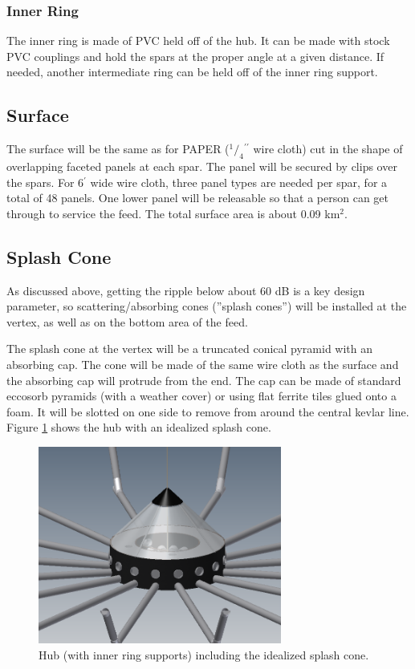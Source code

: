 \documentclass[11pt]{article}
\newcommand{\inch}{$^{\prime\prime}$}
\newcommand{\foot}{$^{\prime}$}
\begin{document}
\subsubsection{Inner Ring}
The inner ring is made of PVC held off of the hub.  It can be made with stock PVC couplings and hold the spars at the proper angle at a given distance.  If needed, another intermediate ring can be held off of the inner ring support.

\subsection{Surface}
The surface will be the same as for PAPER ($^1/_4$\inch{} wire cloth) cut in the shape of overlapping faceted panels at each spar.  The panel will be secured by clips over the spars.  For 6\foot{} wide wire cloth, three panel types are needed per spar, for a total of 48 panels.  One lower panel will be releasable so that a person can get through to service the feed.   The total surface area is about 0.09 km$^2$.

\subsection{Splash Cone}
As discussed above, getting the ripple below about 60 dB is a key design parameter, so scattering/absorbing cones (''splash cones'') will be installed at the vertex, as well as on the bottom area of the feed.

The splash cone at the vertex will be a truncated conical pyramid with an absorbing cap.  The cone will be made of the same wire cloth as the surface and the absorbing cap will protrude from the end.  The cap can be made of standard eccosorb pyramids (with a weather cover) or using flat ferrite tiles glued onto a foam.  It will be slotted on one side to remove from around the central kevlar line.  Figure \ref{fig:hubwithsplash} shows the hub with an idealized splash cone.
\begin{figure}[H]
\centering
\includegraphics[width=8cm]{plots/hubwithsplash.png}
\caption{Hub (with inner ring supports) including the idealized splash cone.}
\label{fig:hubwithsplash}
\end{figure}
\end{document}
